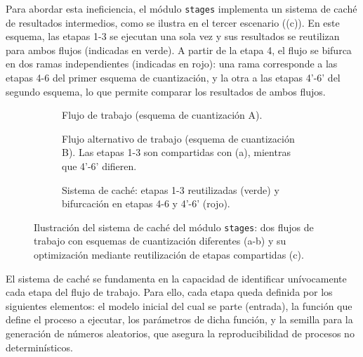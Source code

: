 Para abordar esta ineficiencia, el módulo \texttt{stages} implementa un sistema de caché \cite{hennessy2011computer} de resultados intermedios, como se ilustra en el tercer escenario ((c)). En este esquema, las etapas 1-3 se ejecutan una sola vez y sus resultados se reutilizan para ambos flujos (indicadas en verde). A partir de la etapa 4, el flujo se bifurca en dos ramas independientes (indicadas en rojo): una rama corresponde a las etapas 4-6 del primer esquema de cuantización, y la otra a las etapas 4'-6' del segundo esquema, lo que permite comparar los resultados de ambos flujos.

\begin{figure}[H]
    \centering
    \begin{subfigure}[b]{0.75\textwidth}
        \centering
        \scalebox{0.7}{}
        \caption{Flujo de trabajo (esquema de cuantización A).}
        \label{fig:workflow_completed}
    \end{subfigure}

    \vspace{0.5em}

    \begin{subfigure}[b]{0.75\textwidth}
        \centering
        \scalebox{0.7}{}
        \caption{Flujo alternativo de trabajo (esquema de cuantización B). Las etapas 1-3 son compartidas con (a), mientras que 4'-6' difieren.}
        \label{fig:workflow_invalidated}
    \end{subfigure}

    \vspace{0.5em}

    \begin{subfigure}[b]{0.75\textwidth}
        \centering
        \scalebox{0.7}{}
        \caption{Sistema de caché: etapas 1-3 reutilizadas (verde) y bifurcación en etapas 4-6 y 4'-6' (rojo).}
        \label{fig:workflow_cached}
    \end{subfigure}

    \caption{Ilustración del sistema de caché del módulo \texttt{stages}: dos flujos de trabajo con esquemas de cuantización diferentes (a-b) y su optimización mediante reutilización de etapas compartidas (c).}
    \label{fig:workflow_comparison}
\end{figure}

El sistema de caché se fundamenta en la capacidad de identificar unívocamente cada etapa del flujo de trabajo. Para ello, cada etapa queda definida por los siguientes elementos: el modelo inicial del cual se parte (entrada), la función que define el proceso a ejecutar, los parámetros de dicha función, y la semilla para la generación de números aleatorios, que asegura la reproducibilidad de procesos no determinísticos.

